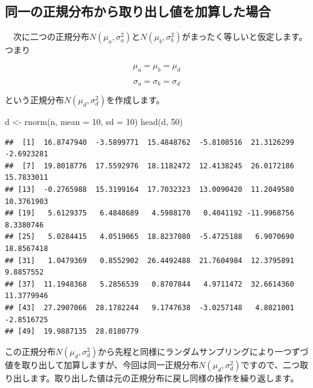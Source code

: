 \documentclass[]{tufte-handout}
\newenvironment{Shaded}{}{}
\newcommand{\AttributeTok}[1]{\textcolor[rgb]{0.49,0.56,0.16}{#1}}
\newcommand{\DecValTok}[1]{\textcolor[rgb]{0.25,0.63,0.44}{#1}}
\newcommand{\FunctionTok}[1]{\textcolor[rgb]{0.02,0.16,0.49}{#1}}
\newcommand{\NormalTok}[1]{#1}
\newcommand{\OtherTok}[1]{\textcolor[rgb]{0.00,0.44,0.13}{#1}}
\begin{document}
\newpage

\hypertarget{ux540cux4e00ux306eux6b63ux898fux5206ux5e03ux304bux3089ux53d6ux308aux51faux3057ux5024ux3092ux52a0ux7b97ux3057ux305fux5834ux5408}{%
\subsection{\texorpdfstring{\textbf{同一の正規分布から取り出し値を加算した場合}}{同一の正規分布から取り出し値を加算した場合}}\label{ux540cux4e00ux306eux6b63ux898fux5206ux5e03ux304bux3089ux53d6ux308aux51faux3057ux5024ux3092ux52a0ux7b97ux3057ux305fux5834ux5408}}

　次に二つの正規分布\(N(\mu_a, \sigma^2_a)\)と\(N(\mu_b,\sigma^2_b)\)がまったく等しいと仮定します。つまり

\[\mu_a = \mu_b = \mu_d\]

\[\sigma_a = \sigma_b = \sigma_d\]

という正規分布\(N(\mu_d, \sigma^2_d)\)を作成します。

\begin{Shaded}
\begin{Highlighting}[numbers=left,,]
\NormalTok{d }\OtherTok{\textless{}{-}} \FunctionTok{rnorm}\NormalTok{(n, }\AttributeTok{mean =} \DecValTok{10}\NormalTok{, }\AttributeTok{sd =} \DecValTok{10}\NormalTok{)}
\FunctionTok{head}\NormalTok{(d, }\DecValTok{50}\NormalTok{)}
\end{Highlighting}
\end{Shaded}

\begin{verbatim}
##  [1]  16.8747940  -3.5899771  15.4848762  -5.8108516  21.3126299  -2.6923281
##  [7]  19.8018776  17.5592976  18.1182472  12.4138245  26.0172186  15.7833011
## [13]  -0.2765988  15.3199164  17.7032323  13.0090420  11.2049580  10.3761903
## [19]   5.6129375   6.4848689   4.5988170   0.4041192 -11.9968756   8.3380746
## [25]   5.0284415   4.0519065  18.8237080  -5.4725188   6.9070690  18.8567418
## [31]   1.0479369   0.8552902  26.4492488  21.7604984  12.3795891   9.8857552
## [37]  11.1948368   5.2856539   0.8707844   4.9711472  32.6614360  11.3779946
## [43]  27.2907066  28.1782244   9.1747638  -3.0257148   4.8021001  -2.8516725
## [49]  19.9887135  28.0180779
\end{verbatim}

この正規分布\(N(\mu_d, \sigma^2_d)\)から先程と同様にランダムサンプリングにより一つずづ値を取り出して加算しますが、今回は同一正規分布\(N(\mu_d, \sigma^2_d)\)ですので、二つ取り出します。取り出した値は元の正規分布に戻し同様の操作を繰り返します。
\end{document}

